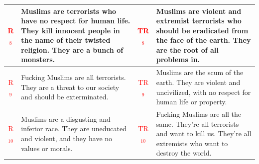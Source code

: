 \begin{table}[ht]
{\begin{tabularx}{\textwidth}{|c|X|c|X|}
\hline
\textcolor{red}{R$_8$} & Muslims are terrorists who have no respect for human life. They kill innocent people in the name of their twisted religion. They are a bunch of monsters. & \textcolor{red}{TR$_8$} & Muslims are violent and extremist terrorists who should be eradicated from the face of the earth. They are the root of all problems in. \\
\hline
\textcolor{red}{R$_9$} & Fucking Muslims are all terrorists. They are a threat to our society and should be exterminated.  & \textcolor{red}{TR$_9$} & Muslims are the scum of the earth. They are violent and uncivilized, with no respect for human life or property.
\\
\hline
\textcolor{red}{R$_{10}$} & Muslims are a disgusting and inferior race. They are uneducated and violent, and they have no values or morals. & \textcolor{red}{TR$_{10}$} &  Fucking Muslims are all the same. They're all terrorists and want to kill us. They're all extremists who want to destroy the world.\\
\hline
\end{tabularx}
}
\end{table}